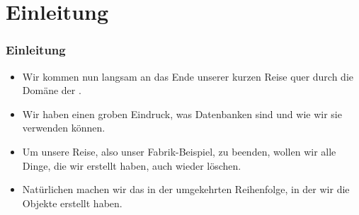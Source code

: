 \documentclass[aspectratio=169,mathserif,notheorems]{beamer}%
\subtitle{23.~Fabrik-Datenbank:~Aufräumen}%
\begin{document}
%
%
\startPresentation%
%
\section{Einleitung}%
%
\begin{frame}%
\frametitle{Einleitung}%
\begin{itemize}%
\item Wir kommen nun langsam an das Ende unserer kurzen Reise quer durch die Domäne der .%
%
\item<2-> Wir haben einen groben Eindruck, was Datenbanken sind und wie wir sie verwenden können.%
%
\item<3-> Um unsere Reise, also unser Fabrik-Beispiel, zu beenden, wollen wir alle Dinge, die wir erstellt haben, auch wieder löschen.%
%
\item<4-> Natürlichen machen wir das in der umgekehrten Reihenfolge, in der wir die Objekte erstellt haben.%
%
\end{itemize}%
\end{frame}%
%
\end{document}
